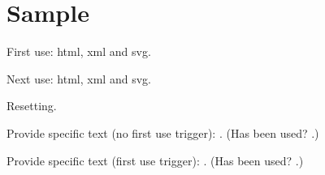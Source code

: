 \documentclass{report}
\begin{document}
\tableofcontents

\chapter{Sample}

First use: \gls{html}, \gls{xml} and \gls{svg}.

Next use: \gls{html}, \gls{xml} and \gls{svg}.

Resetting.
\glsresetall

Provide specific text (no first use trigger): .
(Has been used? .)

Provide specific text (first use trigger): .
(Has been used? .)

\printglossaries
\end{document}
